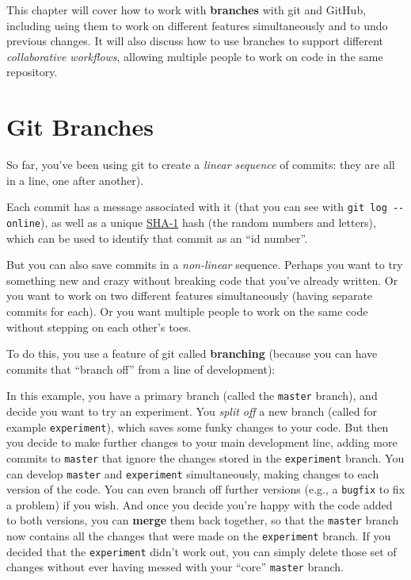 \documentclass[]{book}
\theoremstyle{definition}
\theoremstyle{definition}
\theoremstyle{remark}
\begin{document}
This chapter will cover how to work with \textbf{branches} with git and
GitHub, including using them to work on different features
simultaneously and to undo previous changes. It will also discuss how to
use branches to support different \emph{collaborative workflows},
allowing multiple people to work on code in the same repository.

\hypertarget{git-branches}{\section{Git Branches}\label{git-branches}}

So far, you've been using git to create a \emph{linear sequence} of
commits: they are all in a line, one after another).

Each commit has a message associated with it (that you can see with
\texttt{git\ log\ -\/-online}), as well as a unique
\href{https://en.wikipedia.org/wiki/SHA-1}{SHA-1} hash (the random
numbers and letters), which can be used to identify that commit as an
``id number''.

But you can also save commits in a \emph{non-linear} sequence. Perhaps
you want to try something new and crazy without breaking code that
you've already written. Or you want to work on two different features
simultaneously (having separate commits for each). Or you want multiple
people to work on the same code without stepping on each other's toes.

To do this, you use a feature of git called \textbf{branching} (because
you can have commits that ``branch off'' from a line of development):

In this example, you have a primary branch (called the \texttt{master}
branch), and decide you want to try an experiment. You \emph{split off}
a new branch (called for example \texttt{experiment}), which saves some
funky changes to your code. But then you decide to make further changes
to your main development line, adding more commits to \texttt{master}
that ignore the changes stored in the \texttt{experiment} branch. You
can develop \texttt{master} and \texttt{experiment} simultaneously,
making changes to each version of the code. You can even branch off
further versions (e.g., a \texttt{bugfix} to fix a problem) if you wish.
And once you decide you're happy with the code added to both versions,
you can \textbf{merge} them back together, so that the \texttt{master}
branch now contains all the changes that were made on the
\texttt{experiment} branch. If you decided that the \texttt{experiment}
didn't work out, you can simply delete those set of changes without ever
having messed with your ``core'' \texttt{master} branch.
\end{document}
